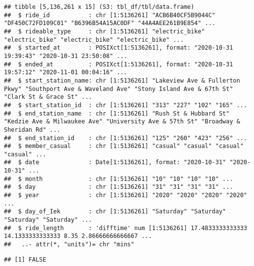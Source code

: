 \documentclass[
]{article}
\newenvironment{Shaded}{\begin{snugshade}}{\end{snugshade}}
\newcommand{\CommentTok}[1]{\textcolor[rgb]{0.56,0.35,0.01}{\textit{#1}}}
\newcommand{\FunctionTok}[1]{\textcolor[rgb]{0.00,0.00,0.00}{#1}}
\newcommand{\NormalTok}[1]{#1}
\newcommand{\OtherTok}[1]{\textcolor[rgb]{0.56,0.35,0.01}{#1}}
\newcommand{\SpecialCharTok}[1]{\textcolor[rgb]{0.00,0.00,0.00}{#1}}
\begin{document}
\begin{verbatim}
## tibble [5,136,261 x 15] (S3: tbl_df/tbl/data.frame)
##  $ ride_id           : chr [1:5136261] "ACB6B40CF5B9044C" "DF450C72FD109C01" "B6396B54A15AC0DF" "44A4AEE261B9E854" ...
##  $ rideable_type     : chr [1:5136261] "electric_bike" "electric_bike" "electric_bike" "electric_bike" ...
##  $ started_at        : POSIXct[1:5136261], format: "2020-10-31 19:39:43" "2020-10-31 23:50:08" ...
##  $ ended_at          : POSIXct[1:5136261], format: "2020-10-31 19:57:12" "2020-11-01 00:04:16" ...
##  $ start_station_name: chr [1:5136261] "Lakeview Ave & Fullerton Pkwy" "Southport Ave & Waveland Ave" "Stony Island Ave & 67th St" "Clark St & Grace St" ...
##  $ start_station_id  : chr [1:5136261] "313" "227" "102" "165" ...
##  $ end_station_name  : chr [1:5136261] "Rush St & Hubbard St" "Kedzie Ave & Milwaukee Ave" "University Ave & 57th St" "Broadway & Sheridan Rd" ...
##  $ end_station_id    : chr [1:5136261] "125" "260" "423" "256" ...
##  $ member_casual     : chr [1:5136261] "casual" "casual" "casual" "casual" ...
##  $ date              : Date[1:5136261], format: "2020-10-31" "2020-10-31" ...
##  $ month             : chr [1:5136261] "10" "10" "10" "10" ...
##  $ day               : chr [1:5136261] "31" "31" "31" "31" ...
##  $ year              : chr [1:5136261] "2020" "2020" "2020" "2020" ...
##  $ day_of_Iek        : chr [1:5136261] "Saturday" "Saturday" "Saturday" "Saturday" ...
##  $ ride_length       : 'difftime' num [1:5136261] 17.4833333333333 14.1333333333333 8.35 2.86666666666667 ...
##   ..- attr(*, "units")= chr "mins"
\end{verbatim}

\begin{Shaded}
\end{Shaded}

\begin{verbatim}
## [1] FALSE
\end{verbatim}

\begin{Shaded}
\end{Shaded}
\end{document}
